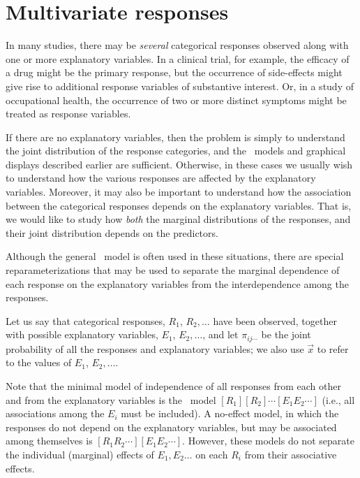 \section{Multivariate responses}\label{sec:loglin-multiv}

In many studies, there may be \emph{several} categorical responses observed
along with one or more explanatory variables.
In a clinical trial, for example, the efficacy of a drug might be the
primary response, but the occurrence of side-effects might give rise to
additional response variables of substantive interest.
Or, in a study of occupational health, the occurrence of two or more
distinct symptoms might be treated as response variables.

If there are no explanatory variables, then the problem is simply to
understand the joint distribution of the response categories,
and the \loglin\ models and graphical displays described earlier
are sufficient.
Otherwise,
in these cases we usually wish to understand how the various responses
are affected by the explanatory variables.
Moreover, it may also be important to understand how the association
between the categorical responses depends on the explanatory variables.
That is, we would like to study how \emph{both} the marginal distributions
of the responses, and their joint distribution depends on the
predictors.

Although the general \loglin\ model is often used in these situations,
there are special reparameterizations that
may be used to separate the marginal dependence of each response
on the explanatory variables from the interdependence among the responses.


Let us say that categorical responses, $R_1$, $R_2, \dots$ have been
observed, together with possible explanatory variables,
$E_1$, $E_2, \dots$,
and let $\pi_{ij\cdots}$ be the joint probability of all the responses
and explanatory variables;
we also use
$\vec{x}$ to refer to the values of $E_1$, $E_2, \dots$.

Note that the minimal model of independence of all responses from each other
and from the explanatory variables is the \loglin\ model
$[R_1] [R_2] \cdots [E_1 E_2 \cdots]$
(i.e., all associations among the $E_i$ must be included).
A no-effect model, in which the responses do not depend on the
explanatory variables, but may be associated among themselves is
$[R_1 R_2 \cdots] [E_1 E_2 \cdots]$.  However,  these models do not separate
the individual
(marginal) effects of $E_1, E_2 \dots$ on each $R_i$ from their associative effects.

